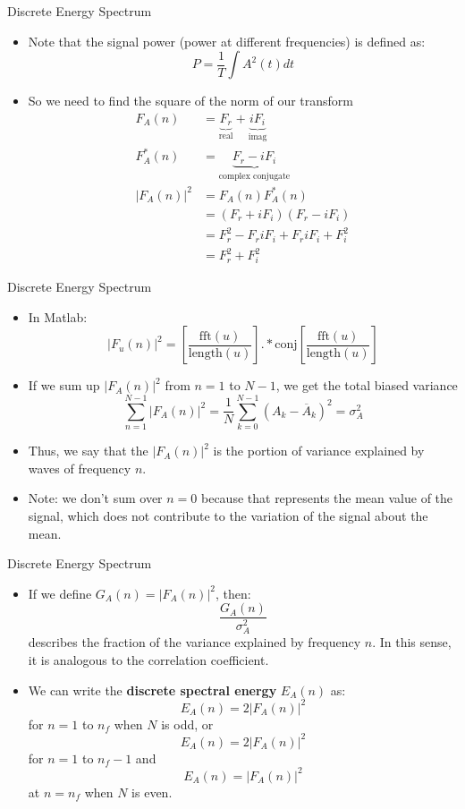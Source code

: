\begin{frame}{Discrete Energy Spectrum}
\begin{itemize}
	\item Note that the signal power (power at different frequencies) is defined as:
	$$P = \frac{1}{T} \displaystyle \int A^2(t) dt$$
	\item So we need to find the square of the norm of our transform
	\begin{align*}
	F_A(n) &= \underbrace{F_r}_{\text{real}} + \underbrace{iF_i}_{\text{imag}}\\
	F_A^*(n) &= \underbrace{F_r - iF_i}_{\text{complex conjugate}}\\
	|F_A(n)|^2 &= F_A(n) F_A^*(n)\\
	&= (F_r+iF_i)(F_r - iF_i)\\
	&= F_r^2 -F_r iF_i + F_r iF_i +F_i^2\\
	&= F_r^2 + F_i^2
	\end{align*}
\end{itemize}
\end{frame}
\begin{frame}{Discrete Energy Spectrum}
\begin{itemize}
	\item In Matlab:
	$$|F_u(n)|^2 = \left[\frac{\text{fft}(u)}{\text{length}(u)}\right] .* \text{conj}\left[\frac{\text{fft}(u)}{\text{length}(u)}\right]$$
	\item If we sum up $|F_A(n)|^2$ from $n=1$ to $N-1$, we get the total biased variance
	$$\displaystyle \sum\limits_{n=1}^{N-1} |F_A(n)|^2 = \frac{1}{N}\displaystyle \sum\limits_{k=0}^{N-1} (A_k - \overline{A}_k)^2 = \sigma_A^2$$
	\item Thus, we say that the $|F_A(n)|^2$ is the portion of variance explained by waves of frequency $n$.
	\item Note: we don't sum over $n=0$ because that represents the mean value of the signal, which does not contribute to the variation of the signal about the mean.
\end{itemize}
\end{frame}
\begin{frame}{Discrete Energy Spectrum}
\begin{itemize}
	\item If we define $G_A(n) = |F_A(n)|^2$, then:
	$$\frac{G_A(n)}{\sigma_A^2}$$
	describes the fraction of the variance explained by frequency $n$. In this sense, it is analogous to the correlation coefficient.
	\item We can write the \textbf{discrete spectral energy} $E_A(n)$ as:
	$$E_A(n) = 2|F_A(n)|^2$$
	for $n=1$ to $n_f$ when $N$ is odd, or
	$$E_A(n) = 2|F_A(n)|^2$$ for $n=1$ to $n_f-1$ and 
	$$E_A(n) = |F_A(n)|^2$$ at $n=n_f$ when $N$ is even.
\end{itemize}
\end{frame}
